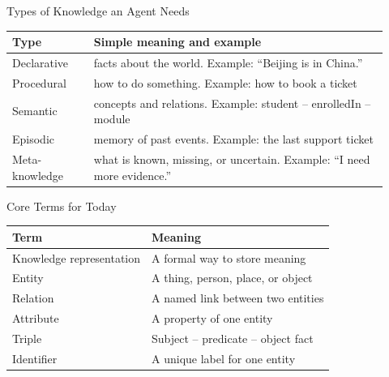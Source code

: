 \documentclass[aspectratio=169]{beamer}
\newcommand{\defaultdeckrefs}{AIMA4e Ch.10 pp.314--343; Poole3e Ch.16 pp.701--730}
\newcommand{\currentsliderefs}{\defaultdeckrefs}
\newcommand{\setslideref}[1]{\gdef\currentsliderefs{#1}}
\begin{document}
\setslideref{AIMA4e Ch.10 pp.314--343; Poole3e Ch.16 pp.701--730}
\begin{frame}{Types of Knowledge an Agent Needs}
\small
\begin{tabular}{@{}p{0.2\linewidth}p{0.72\linewidth}@{}}
\toprule
\textbf{Type} & \textbf{Simple meaning and example} \\
\midrule
Declarative & facts about the world. Example: ``Beijing is in China.'' \\
Procedural & how to do something. Example: how to book a ticket \\
Semantic & concepts and relations. Example: student -- enrolledIn -- module \\
Episodic & memory of past events. Example: the last support ticket \\
Meta-knowledge & what is known, missing, or uncertain. Example: ``I need more evidence.'' \\
\bottomrule
\end{tabular}
\end{frame}

\setslideref{AIMA4e Ch.10 pp.314--343; Poole3e Ch.16 pp.701--730}
\begin{frame}{Core Terms for Today}
\begin{center}
\begin{tabular}{@{}ll@{}}
\toprule
Term & Meaning \\
\midrule
Knowledge representation & A formal way to store meaning \\
Entity & A thing, person, place, or object \\
Relation & A named link between two entities \\
Attribute & A property of one entity \\
Triple & Subject -- predicate -- object fact \\
Identifier & A unique label for one entity \\
\bottomrule
\end{tabular}
\end{center}
\end{frame}
\end{document}
